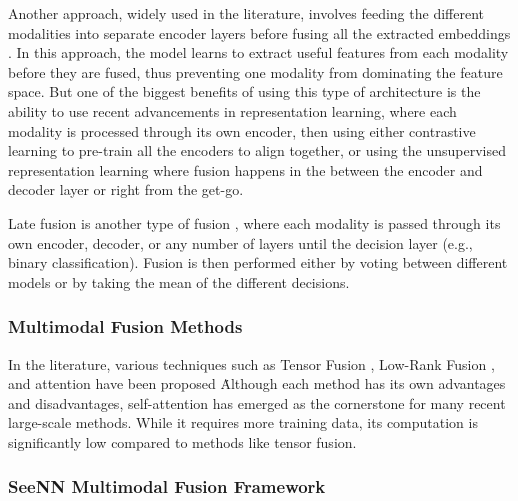 Another approach, widely used in the literature, involves feeding the different modalities into separate encoder layers before fusing all the extracted embeddings \cite{huang_fusion_2020}. In this approach, the model learns to extract useful features from each modality before they are fused, thus preventing one modality from dominating the feature space. But one of the biggest benefits of using this type of architecture is the ability to use recent advancements in representation learning, where each modality is processed through its own encoder, then using either contrastive learning to pre-train all the encoders to align together, or using the unsupervised representation learning where fusion happens in the between the encoder and decoder layer or right from the get-go.

Late fusion is another type of fusion \cite{huang_fusion_2020}, where each modality is passed through its own encoder, decoder, or any number of layers until the decision layer (e.g., binary classification). Fusion is then performed either by voting between different models or by taking the mean of the different decisions.

\subsubsection{Multimodal Fusion Methods}
In the literature, various techniques such as Tensor Fusion \cite{zadeh2017tensorfusionnetworkmultimodal}, Low-Rank Fusion \cite{liu2018efficientlowrankmultimodalfusion}, and attention \cite{NEURIPS2021_76ba9f56} have been proposed \. Although each method has its own advantages and disadvantages, self-attention has emerged as the cornerstone for many recent large-scale methods. While it requires more training data, its computation is significantly low compared to methods like tensor fusion.


\subsubsection{SeeNN Multimodal Fusion Framework}

\label{subsub:proposed}


